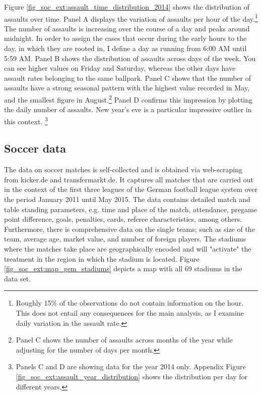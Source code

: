 \documentclass[11pt, a4paper]{article} %
\begin{document}
Figure \ref{fig_soc_ext:assault_time_distribution_2014} shows the distribution of assaults over time. Panel A displays the variation of assaults per hour of the day.\footnote{Roughly 15\% of the observations do not contain information on the hour. This does not entail any consequences for the main analysis, as I examine daily variation in the assault rate.} The number of assaults is increasing over the course of a day and peaks around midnight. In order to assign the cases that occur during the early hours to the day, in which they are rooted in, I define a day as running from 6:00 AM until 5:59 AM. Panel B shows the distribution of assaults across days of the week. You can see higher values on Friday and Saturday, whereas the other days have assault rates belonging to the same ballpark. Panel C shows that the number of assaults have a strong seasonal pattern with the highest value recorded in May, and the smallest figure in August.\footnote{Panel C shows the number of assaults across months of the year while adjusting for the number of days per month.} Panel D confirms this impression by plotting the daily number of assaults. New year's eve is a particular impressive outlier in this context. \footnote{Panels C and D are showing data for the year 2014 only. Appendix Figure \ref{fig_soc_ext:assault_year_distribution} shows the distribution per day for different years.}




\subsection{Soccer data}
The data on soccer matches is self-collected and is obtained via web-scraping from kicker.de and transfermarkt.de. It captures all matches that are carried out in the context of the first three leagues of the German football league system over the period January 2011 until May 2015. The data contains detailed match and table standing parameters, e.g. time and place of the match, attendance, pregame point difference, goals, penalties, cards, referee characteristics, among others. Furthermore, there is comprehensive data on the single teams; such as size of the team, average age, market value, and number of foreign players. The stadiums where the matches take place are geographically encoded and will "activate" the treatment in the region in which the stadium is located. Figure \ref{fig_soc_ext:map_gem_stadiums} depicts a map with all 69 stadiums in the data set. 
\end{document}
